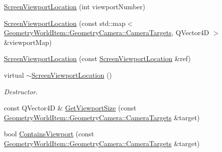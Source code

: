 \begin{DoxyCompactItemize}
\item 
\mbox{\hyperlink{class_geometry_engine_1_1_geometry_render_step_1_1_screen_viewport_location_a6a75c7e5bd03280a3d1841b0f0ded251}{Screen\+Viewport\+Location}} (int viewport\+Number)
\item 
\mbox{\hyperlink{class_geometry_engine_1_1_geometry_render_step_1_1_screen_viewport_location_a9864eb50caa425353d192061b5415922}{Screen\+Viewport\+Location}} (const std\+::map$<$ \mbox{\hyperlink{namespace_geometry_engine_1_1_geometry_world_item_1_1_geometry_camera_a3766848bae97ff8203fa26907ac359ef}{Geometry\+World\+Item\+::\+Geometry\+Camera\+::\+Camera\+Targets}}, Q\+Vector4D $>$ \&viewport\+Map)
\item 
\mbox{\hyperlink{class_geometry_engine_1_1_geometry_render_step_1_1_screen_viewport_location_a48164f2c04f800d345b9193c5f0f35da}{Screen\+Viewport\+Location}} (const \mbox{\hyperlink{class_geometry_engine_1_1_geometry_render_step_1_1_screen_viewport_location}{Screen\+Viewport\+Location}} \&ref)
\item 
\mbox{\label{class_geometry_engine_1_1_geometry_render_step_1_1_screen_viewport_location_ac94a9d9ccdfe42629ab4a9109e01dd58}} 
virtual \mbox{\hyperlink{class_geometry_engine_1_1_geometry_render_step_1_1_screen_viewport_location_ac94a9d9ccdfe42629ab4a9109e01dd58}{$\sim$\+Screen\+Viewport\+Location}} ()
\begin{DoxyCompactList}\small\item\em Destructor. \end{DoxyCompactList}\item 
const Q\+Vector4D \& \mbox{\hyperlink{class_geometry_engine_1_1_geometry_render_step_1_1_screen_viewport_location_a3bcef52c0565d793d2688cf19d2c6852}{Get\+Viewport\+Size}} (const \mbox{\hyperlink{namespace_geometry_engine_1_1_geometry_world_item_1_1_geometry_camera_a3766848bae97ff8203fa26907ac359ef}{Geometry\+World\+Item\+::\+Geometry\+Camera\+::\+Camera\+Targets}} \&target)
\item 
bool \mbox{\hyperlink{class_geometry_engine_1_1_geometry_render_step_1_1_screen_viewport_location_ab0173ef8e36303f2d0c742373ff758e0}{Contains\+Viewport}} (const \mbox{\hyperlink{namespace_geometry_engine_1_1_geometry_world_item_1_1_geometry_camera_a3766848bae97ff8203fa26907ac359ef}{Geometry\+World\+Item\+::\+Geometry\+Camera\+::\+Camera\+Targets}} \&target)
\item 

\end{DoxyCompactItemize}
